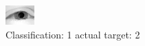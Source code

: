 \begin{figure}[h!]
\begin{center}
\includegraphics[width=0.60\columnwidth]{figures/ID2236_class_1_target_2.png}
\end{center}
\caption{ Classification: 1 actual target: 2}
\label{fig:ID2236_class_1_target_2}
\end{figure}
